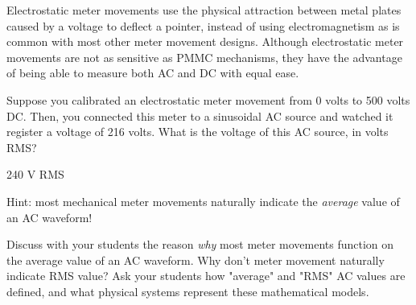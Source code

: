 

Electrostatic meter movements use the physical attraction between metal plates caused by a voltage to deflect a pointer, instead of using electromagnetism as is common with most other meter movement designs.  Although electrostatic meter movements are not as sensitive as PMMC mechanisms, they have the advantage of being able to measure both AC and DC with equal ease.

Suppose you calibrated an electrostatic meter movement from 0 volts to 500 volts DC.  Then, you connected this meter to a sinusoidal AC source and watched it register a voltage of 216 volts.  What is the voltage of this AC source, in volts RMS?







240 V RMS

\vskip 10pt

Hint: most mechanical meter movements naturally indicate the {\it average} value of an AC waveform!







Discuss with your students the reason {\it why} most meter movements function on the average value of an AC waveform.  Why don't meter movement naturally indicate RMS value?  Ask your students how "average" and "RMS" AC values are defined, and what physical systems represent these mathematical models.



